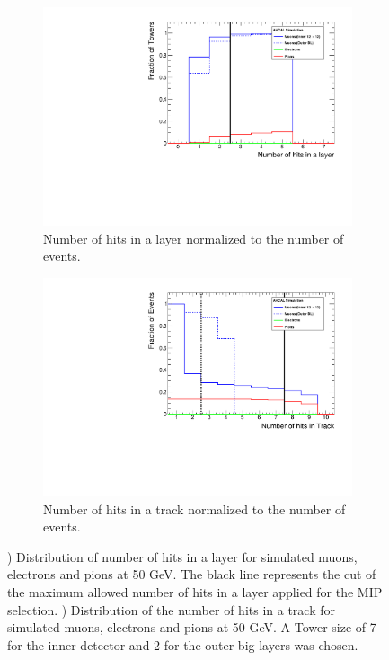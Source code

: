 \begin{figure}[htbp!]
	\begin{subfigure}[t]{0.5\textwidth}
		\centering
		\includegraphics[width=1\linewidth]{../Thesis_Plots/Timing/Muons/Plots/TrackFinderCut_nHitsLayer_Muons}
		\caption{Number of hits in a layer normalized to the number of events.} \label{fig:Muons_Track_nHitsLayer}
	\end{subfigure}
	\hfill
	\begin{subfigure}[t]{0.5\textwidth}
		\centering
		\includegraphics[width=1\linewidth]{../Thesis_Plots/Timing/Muons/Plots/TrackFinderCut_nHitsTrack_Muons}
		\caption{Number of hits in a track normalized to the number of events.} \label{fig:Muons_Track_nHits}
	\end{subfigure}
	\caption{) Distribution of number of hits in a layer for simulated muons, electrons and pions at 50 GeV. The black line represents the cut of the maximum allowed number of hits in a layer applied for the MIP selection. ) Distribution of the number of hits in a track for simulated muons, electrons and pions at 50 GeV. A Tower size of 7 for the inner detector and 2 for the outer big layers was chosen.}
\end{figure}

